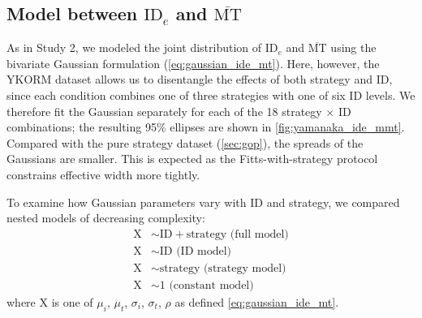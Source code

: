 \documentclass[acmlarge, manuscript,review]{acmart}
\newcommand{\mmt}{\ensuremath{\overline{\mt}}\xspace}
\newcommand{\mt}{\ensuremath{{\text{MT}}}\xspace}
\newcommand{\ide}{\ensuremath{{\text{ID}_e}}\xspace}
\begin{document}



\subsection{Model between \ide and \mmt}
As in Study 2, we modeled the joint distribution of \ide and \mmt using the bivariate Gaussian formulation (\autoref{eq:gaussian_ide_mt}). Here, however, the YKORM dataset allows us to disentangle the effects of both strategy and ID, since each condition combines one of three strategies with one of six ID levels. We therefore fit the Gaussian separately for each of the 18 strategy $\times$ ID combinations; the resulting 95\% ellipses are shown in \autoref{fig:yamanaka_ide_mmt}.
Compared with the pure strategy dataset (\autoref{sec:gop}), the spreads of the Gaussians are smaller. This is expected as the Fitts-with-strategy protocol constrains effective width more tightly.

To examine how Gaussian parameters vary with ID and strategy, we compared nested models of decreasing complexity:
\begin{align}
	\text{X} & \sim \text{ID} + \text{strategy (full model)}  \\
	\text{X} &\sim \text{ID (ID model)} \\
	\text{X} &\sim \text{strategy (strategy model)} \\
	\text{X} &\sim 1 \text{ (constant model)} 
\end{align}
where X is one of $\mu_i$, $\mu_t$, $\sigma_i$, $\sigma_t$, $\rho$ as defined \autoref{eq:gaussian_ide_mt}. 
\end{document}
